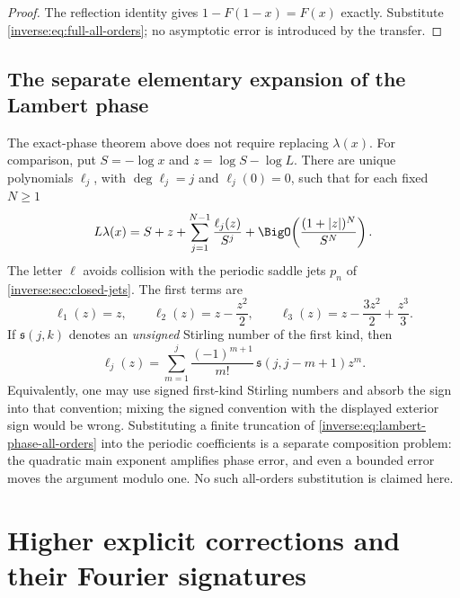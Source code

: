 \documentclass[11pt,oneside]{article}
\theoremstyle{definition}
\theoremstyle{remark}
\begin{document}
\begin{proof}
The reflection identity gives \(1-F(1-x)=F(x)\) exactly.  Substitute
\eqref{inverse:eq:full-all-orders}; no asymptotic error is introduced by the transfer.
\end{proof}

\subsection{The separate elementary expansion of the Lambert phase}

The exact-phase theorem above does not require replacing \(\lambda(x)\).  For comparison,
put \(S=-\log x\) and \(z=\log S-\log L\).  There are unique polynomials
\(\ell_j\), with \(\deg\ell_j=j\) and \(\ell_j(0)=0\), such that for each fixed
\(N\geq1\)
\begin{equation}
 L\lambda(x)=S+z+\sum_{j=1}^{N-1}\frac{\ell_j(z)}{S^j}
 +\BigO\!\left(\frac{(1+|z|)^N}{S^N}\right).
 \label{inverse:eq:lambert-phase-all-orders}
\end{equation}
The letter \(\ell\) avoids collision with the periodic saddle jets \(p_n\) of
\cref{inverse:sec:closed-jets}.  The first terms are
\[
 \ell_1(z)=z,\qquad
 \ell_2(z)=z-\frac{z^2}{2},\qquad
 \ell_3(z)=z-\frac{3z^2}{2}+\frac{z^3}{3}.
\]
If \(\mathfrak s(j,k)\) denotes an \emph{unsigned} Stirling number of the first kind, then
\begin{equation}
 \ell_j(z)=\sum_{m=1}^{j}
 \frac{(-1)^{m+1}}{m!}\,
 \mathfrak s(j,j-m+1)z^m.
 \label{inverse:eq:lambert-phase-stirling}
\end{equation}
Equivalently, one may use signed first-kind Stirling numbers and absorb the sign into that
convention; mixing the signed convention with the displayed exterior sign would be wrong.
Substituting a finite truncation of \eqref{inverse:eq:lambert-phase-all-orders} into the
periodic coefficients is a separate composition problem: the quadratic main exponent
amplifies phase error, and even a bounded error moves the argument modulo one.  No such
all-orders substitution is claimed here.

\section{Higher explicit corrections and their Fourier signatures}
\label{inverse:sec:higher-explicit}
\end{document}
